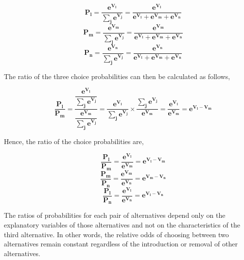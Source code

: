 \documentclass[a4paper,11pt]{article}
\begin{document}
    \begin{equation*}
        \qquad \mathbf{P_{l} = \dfrac{e^{V_{l}}}{\sum_{j}e^{V_{j}}} = \dfrac{e^{V_{l}}}{e^{V_{l}} + e^{V_{m}} + e^{V_{n}}}}
    \end{equation*}
    \begin{equation*}
        \qquad \mathbf{P_{m} = \dfrac{e^{V_{m}}}{\sum_{j}e^{V_{j}}} = \dfrac{e^{V_{m}}}{e^{V_{l}} + e^{V_{m}} + e^{V_{n}}}}
    \end{equation*}
    \begin{equation*}
        \qquad \mathbf{P_{n} = \dfrac{e^{V_{n}}}{\sum_{j}e^{V_{j}}} = \dfrac{e^{V_{n}}}{e^{V_{l}} + e^{V_{m}} + e^{V_{n}}}}
    \end{equation*}

    The ratio of the three choice probabilities can then be calculated as follows,

    \begin{equation*}
        \qquad \mathbf{\dfrac{P_{l}}{P_{m}} = \dfrac{\dfrac{e^{V_{l}}}{\sum_{j}e^{V_{j}}}}{\dfrac{e^{V_{m}}}{\sum_{j}e^{V_{j}}}} = \dfrac{e^{V_{l}}}{\sum_{j}e^{V_{j}}} \times \dfrac{\sum_{j}e^{V_{j}}}{e^{V_{m}}} = \dfrac{e^{V_{l}}}{e^{V_{m}}} = e^{V_{l}-V_{m}}} 
    \end{equation*}

    Hence, the ratio of the choice probabilities are,
    
    \begin{equation*}
        \qquad \mathbf{\dfrac{P_{l}}{P_{m}} = \dfrac{e^{V_{l}}}{e^{V_{m}}} = e^{V_{l}-V_{m}}} 
    \end{equation*}
    \begin{equation*}
        \qquad \mathbf{\dfrac{P_{m}}{P_{n}} = \dfrac{e^{V_{m}}}{e^{V_{n}}} = e^{V_{m}-V_{n}}} 
    \end{equation*}
    \begin{equation*}
        \qquad \mathbf{\dfrac{P_{l}}{P_{n}} = \dfrac{e^{V_{l}}}{e^{V_{n}}} = e^{V_{l}-V_{n}}} 
    \end{equation*}

    The ratios of probabilities for each pair of alternatives depend only on the explanatory variables of those alternatives and not on the characteristics of the third alternative. In other words, the relative odds of choosing between two alternatives remain constant regardless of the introduction or removal of other alternatives.\\
\end{document}
